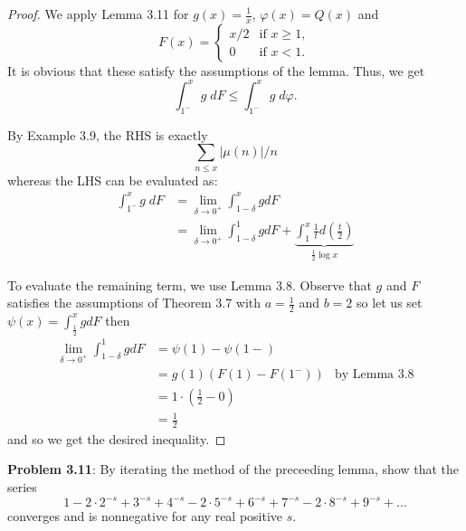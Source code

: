 \documentclass{article}
\begin{document}
\begin{proof}
We apply Lemma 3.11 for $g(x) = \frac{1}{x}$, $\varphi(x) = Q(x)$ and
$$F(x) = \begin{cases}
x/2 &\text{if } x \geq 1,\\
0 &\text{if } x < 1.
\end{cases}$$
It is obvious that these satisfy the assumptions of the lemma. Thus, we get
$$\int_{1^-}^x g \; dF \leq \int_{1^-}^x g \; d\varphi.$$

By Example 3.9, the RHS is exactly
$$\sum_{n \leq x} |\mu(n)|/n$$
whereas the LHS can be evaluated as:
\begin{align*}
\int_{1^-}^x g \; dF &= \lim_{\delta \rightarrow 0^+} \int_{1 - \delta}^x g d F\\
&= \lim_{\delta \rightarrow 0^+} \int_{1 - \delta}^1 g d F + \underbrace{\int_1^x \frac{1}{t} d \left(\frac{t}{2}\right)}_{\frac 12 \log x}
\end{align*}

To evaluate the remaining term, we use Lemma 3.8. Observe that $g$ and $F$ satisfies the assumptions of Theorem 3.7 with $a = \frac 12$ and $b = 2$ so let us set $\psi(x) = \int_{\frac 12}^x g dF$ then
\begin{align*}
\lim_{\delta \rightarrow 0^+} \int_{1 - \delta}^1 g d F &= \psi(1) - \psi(1-)\\
&= g(1) (F(1) - F(1^-)) &\text{by Lemma 3.8}\\
&= 1 \cdot \left(\frac12 - 0\right)\\
&= \frac 12
\end{align*}
and so we get the desired inequality.
\end{proof}

\textbf{Problem 3.11}: By iterating the method of the preceeding lemma, show that the series
$$1 - 2 \cdot 2^{-s} + 3^{-s} + 4^{-s} - 2 \cdot 5^{-s} + 6^{-s} + 7^{-s} - 2 \cdot 8^{-s} + 9^{-s} + ...$$
converges and is nonnegative for any real positive $s$.
\end{document}
